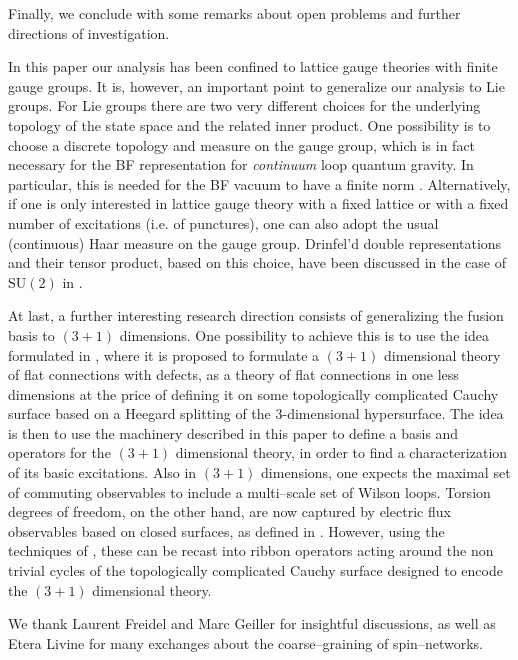 \documentclass[nofootinbib,superscriptaddress,eqsecnum,tightenlines,11pt]{revtex4-1}
\def\SU{\text{SU}}
\begin{document}
Finally, we conclude with some remarks about open problems and further directions of investigation.

In this paper our analysis has been confined to lattice gauge theories with finite gauge groups. It is, however, an important point to generalize our analysis to Lie groups. For Lie groups there are two very different choices for the underlying topology of the state space and the related inner product. One possibility is to choose a discrete topology and measure on the gauge group, which is in fact necessary for the BF representation for {\it continuum} loop quantum gravity. In particular, this is needed for the BF vacuum to have a  finite norm \cite{BDG15}. Alternatively, if one is only interested in lattice gauge theory with a fixed lattice or with a fixed number of excitations (i.e. of punctures), one can also adopt the usual (continuous) Haar measure on the gauge group. Drinfel'd double representations and their tensor product, based on this choice, have been discussed in the case of $\SU(2)$ in \cite{koornw}. 

At last, a further interesting research direction consists of generalizing the fusion basis to $(3+1)$ dimensions. One possibility to achieve this is to use the idea formulated in \cite{DelDitt,Dittrich:2017nmq}, where it is proposed to formulate a $(3+1)$ dimensional theory of flat connections with defects, as a theory of flat connections in one less dimensions at the price of defining it on some topologically complicated Cauchy surface based on a Heegard splitting of the 3-dimensional hypersurface. The idea is then to use the machinery described in this paper to define a basis and operators for the  $(3+1)$ dimensional theory, in order to find a characterization of its basic excitations.  Also in $(3+1)$ dimensions, one expects the maximal set of commuting observables to include a multi--scale set of Wilson loops. Torsion degrees of freedom, on the other hand, are now captured by electric flux observables based on closed surfaces, as defined in \cite{DG14b,BDG15}. However, using the techniques of \cite{DelDitt}, these can be recast into ribbon operators acting around the non trivial cycles of the topologically complicated Cauchy surface designed to encode the $(3+1)$ dimensional theory.




\acknowledgements

We thank Laurent Freidel and Marc Geiller for insightful discussions,  as well as Etera Livine for many exchanges about the coarse--graining of spin--networks.
\end{document}
